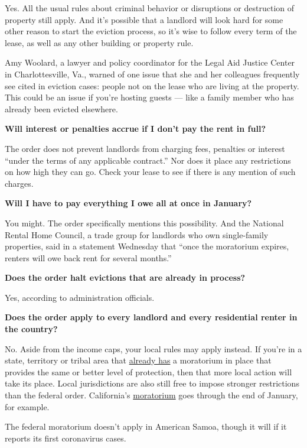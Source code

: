 Yes. All the usual rules about criminal behavior or disruptions or
destruction of property still apply. And it's possible that a landlord
will look hard for some other reason to start the eviction process, so
it's wise to follow every term of the lease, as well as any other
building or property rule.

Amy Woolard, a lawyer and policy coordinator for the Legal Aid Justice
Center in Charlottesville, Va., warned of one issue that she and her
colleagues frequently see cited in eviction cases: people not on the
lease who are living at the property. This could be an issue if you're
hosting guests --- like a family member who has already been evicted
elsewhere.

\textbf{Will interest or penalties accrue if I don't pay the rent in
full?}

The order does not prevent landlords from charging fees, penalties or
interest ``under the terms of any applicable contract.'' Nor does it
place any restrictions on how high they can go. Check your lease to see
if there is any mention of such charges.

\textbf{Will I have to pay everything I owe all at once in January?}

You might. The order specifically mentions this possibility. And the
National Rental Home Council, a trade group for landlords who own
single-family properties, said in a statement Wednesday that ``once the
moratorium expires, renters will owe back rent for several months.''

\textbf{Does the order halt evictions that are already in process?}

Yes, according to administration officials.

\textbf{Does the order apply to every landlord and every residential
renter in the country?}

No. Aside from the income caps, your local rules may apply instead. If
you're in a state, territory or tribal area that
\href{https://evictionlab.org/covid-eviction-policies/}{already has} a
moratorium in place that provides the same or better level of
protection, then that more local action will take its place. Local
jurisdictions are also still free to impose stronger restrictions than
the federal order. California's
\href{https://www.gov.ca.gov/2020/08/31/governor-newsom-signs-statewide-covid-19-tenant-and-landlord-protection-legislation/}{moratorium}
goes through the end of January, for example.

The federal moratorium doesn't apply in American Samoa, though it will
if it reports its first coronavirus cases.

